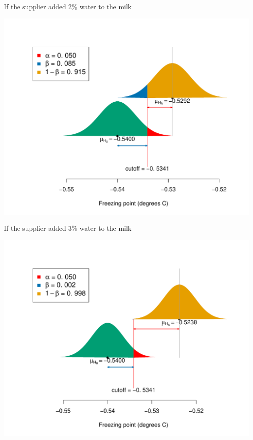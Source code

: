 \documentclass[10pt,handout]{beamer}\usepackage[]{graphicx}\usepackage[]{color}
\makeatletter
\def\maxwidth{ %
  \ifdim\Gin@nat@width>\linewidth
    \linewidth
  \else
    \Gin@nat@width
  \fi
}
\newenvironment{knitrout}{}{} %
\makeatother
\begin{document}
\begin{frame}[fragile]{If the supplier added 2\% water to the milk}
\begin{knitrout}\tiny
{}\color{fgcolor}

{\centering \includegraphics[width=\maxwidth]{figure/unnamed-chunk-8-1} 

}



\end{knitrout}
\end{frame}

\begin{frame}[fragile]{If the supplier added 3\% water to the milk}
\begin{knitrout}\tiny
{}\color{fgcolor}

{\centering \includegraphics[width=\maxwidth]{figure/unnamed-chunk-9-1} 

}



\end{knitrout}
\end{frame}
\end{document}
